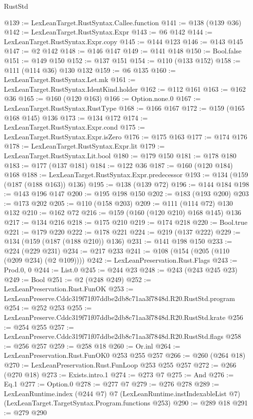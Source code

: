 \begin{lexlean}{RustStd}
\begin{coremodule}
@139 := LexLeanTarget.RustSyntax.Callee.function
@141 := @138 (@139 @36)
@142 := LexLeanTarget.RustSyntax.Expr
@143 := @6 @142
@144 := LexLeanTarget.RustSyntax.Expr.copy
@145 := @144 @123
@146 := @143 @145
@147 := @2 @142
@148 := @146 @147
@149 := @141 @148
@150 := Bool.false
@151 := @149 @150
@152 := @137 @151
@154 := @110 (@133 @152)
@158 := @111 (@114 @36) @130 @132
@159 := @6 @135
@160 := LexLeanTarget.RustSyntax.Let.mk
@161 := LexLeanTarget.RustSyntax.IdentKind.holder
@162 := @112 @161
@163 := @162 @36
@165 := @160 (@120 @163)
@166 := Option.none.{0}
@167 := LexLeanTarget.RustSyntax.RustType
@168 := @166 @167
@172 := @159 (@165 @168 @145) @136
@173 := @134 @172
@174 := LexLeanTarget.RustSyntax.Expr.cond
@175 := LexLeanTarget.RustSyntax.Expr.isZero
@176 := @175 @163
@177 := @174 @176
@178 := LexLeanTarget.RustSyntax.Expr.lit
@179 := LexLeanTarget.RustSyntax.Lit.bool
@180 := @179 @150
@181 := @178 @180
@183 := @177 (@137 @181)
@184 := @122 @36
@187 := @160 (@120 @184) @168
@188 := LexLeanTarget.RustSyntax.Expr.predecessor
@193 := @134 (@159 (@187 (@188 @163)) @136)
@195 := @138 (@139 @72)
@196 := @144 @184
@198 := @143 @196 @147
@200 := @195 @198 @150
@202 := @183 (@193 @200)
@203 := @173 @202
@205 := @110 (@158 @203)
@209 := @111 (@114 @72) @130 @132
@210 := @162 @72
@216 := @159 (@160 (@120 @210) @168 @145) @136
@217 := @134 @216
@218 := @175 @210
@219 := @174 @218
@220 := Bool.true
@221 := @179 @220
@222 := @178 @221
@224 := @219 (@137 @222)
@229 := @134 (@159 (@187 (@188 @210)) @136)
@231 := @141 @198 @150
@233 := @224 (@229 @231)
@234 := @217 @233
@241 := @108 (@154 (@205 (@110 (@209 @234) (@2 @109))))
@242 := LexLeanPreservation.Rust.Flags
@243 := Prod.{0, 0}
@244 := List.{0}
@245 := @244 @23
@248 := @243 (@243 @245 @23)
@249 := Bool
@251 := @2 (@248 @249)
@252 := LexLeanPreservation.Rust.FunOK
@253 := LexLeanPreserve.Cddc319f71f07ddbe2db8c71aa3f7848d.R20.RustStd.program
@254 := @252 @253
@255 := LexLeanPreserve.Cddc319f71f07ddbe2db8c71aa3f7848d.R20.RustStd.krate
@256 := @254 @255
@257 := LexLeanPreserve.Cddc319f71f07ddbe2db8c71aa3f7848d.R20.RustStd.flags
@258 := @256 @257
@259 := @258 @18
@260 := Or.inl
@264 := LexLeanPreservation.Rust.FunOK0 @253 @255 @257
@266 := @260 (@264 @18)
@270 := LexLeanPreservation.Rust.FunLoop @253 @255 @257
@272 := @266 (@270 @18)
@273 := Exists.intro.{1}
@274 := @273 @7
@275 := And
@276 := Eq.{1}
@277 := Option.{0}
@278 := @277 @7
@279 := @276 @278
@289 := LexLeanRuntime.index
    (@244 @7)
    @7
    (LexLeanRuntime.instIndexableList @7)
    (LexLeanTarget.TargetSyntax.Program.functions @253)
@290 := @289 @18
@291 := @279 @290

\end{coremodule}
\end{lexlean}
